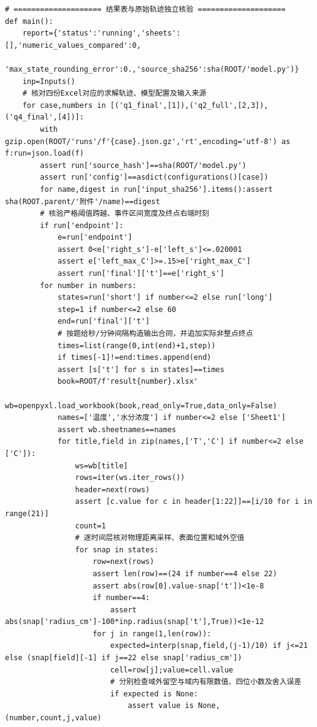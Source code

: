 \begin{Verbatim}[fontsize=\scriptsize,breaklines=true,breakanywhere=true]
# ==================== 结果表与原始轨迹独立核验 ====================
def main():
    report={'status':'running','sheets':[],'numeric_values_compared':0,
            'max_state_rounding_error':0.,'source_sha256':sha(ROOT/'model.py')}
    inp=Inputs()
    # 核对四份Excel对应的求解轨迹、模型配置及输入来源
    for case,numbers in [('q1_final',[1]),('q2_full',[2,3]),('q4_final',[4])]:
        with gzip.open(ROOT/'runs'/f'{case}.json.gz','rt',encoding='utf-8') as f:run=json.load(f)
        assert run['source_hash']==sha(ROOT/'model.py')
        assert run['config']==asdict(configurations()[case])
        for name,digest in run['input_sha256'].items():assert sha(ROOT.parent/'附件'/name)==digest
        # 核验严格阈值跨越、事件区间宽度及终点右端时刻
        if run['endpoint']:
            e=run['endpoint']
            assert 0<e['right_s']-e['left_s']<=.020001
            assert e['left_max_C']>=.15>e['right_max_C']
            assert run['final']['t']==e['right_s']
        for number in numbers:
            states=run['short'] if number<=2 else run['long']
            step=1 if number<=2 else 60
            end=run['final']['t']
            # 按题给秒/分钟间隔构造输出合同，并追加实际非整点终点
            times=list(range(0,int(end)+1,step))
            if times[-1]!=end:times.append(end)
            assert [s['t'] for s in states]==times
            book=ROOT/f'result{number}.xlsx'
            wb=openpyxl.load_workbook(book,read_only=True,data_only=False)
            names=['温度','水分浓度'] if number<=2 else ['Sheet1']
            assert wb.sheetnames==names
            for title,field in zip(names,['T','C'] if number<=2 else ['C']):
                ws=wb[title]
                rows=iter(ws.iter_rows())
                header=next(rows)
                assert [c.value for c in header[1:22]]==[i/10 for i in range(21)]
                count=1
                # 逐时间层核对物理距离采样、表面位置和域外空值
                for snap in states:
                    row=next(rows)
                    assert len(row)==(24 if number==4 else 22)
                    assert abs(row[0].value-snap['t'])<1e-8
                    if number==4:
                        assert abs(snap['radius_cm']-100*inp.radius(snap['t'],True))<1e-12
                    for j in range(1,len(row)):
                        expected=interp(snap,field,(j-1)/10) if j<=21 else (snap[field][-1] if j==22 else snap['radius_cm'])
                        cell=row[j];value=cell.value
                        # 分别检查域外留空与域内有限数值、四位小数及舍入误差
                        if expected is None:
                            assert value is None,(number,count,j,value)

\end{Verbatim}
